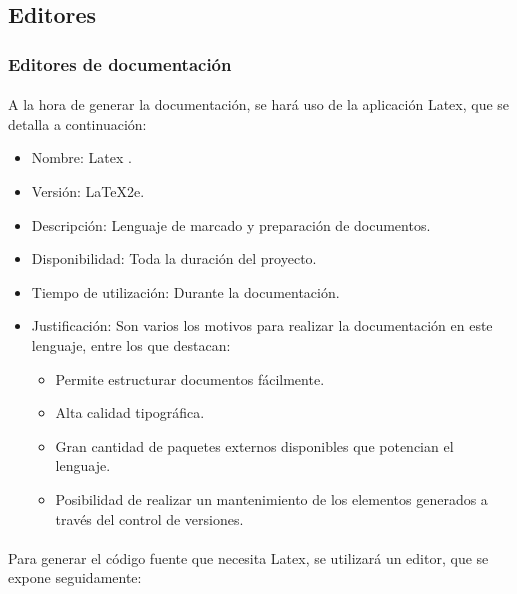    \subsection{Editores}

      \subsubsection{Editores de documentación}

      \paragraph{}A la hora de generar la documentación, se hará uso de la
      aplicación Latex, que se detalla a continuación:

      \begin{itemize}
         \item Nombre: Latex \cite{latex}.
         \item Versión: LaTeX2e.
         \item Descripción: Lenguaje de marcado y preparación de documentos.
         \item Disponibilidad: Toda la duración del proyecto.
         \item Tiempo de utilización: Durante la documentación.
         \item Justificación: Son varios los motivos para realizar la
         documentación en este lenguaje, entre los que destacan:
            \begin{itemize}
               \item Permite estructurar documentos fácilmente.
               \item Alta calidad tipográfica.
               \item Gran cantidad de paquetes externos disponibles que
               potencian el lenguaje.
               \item Posibilidad de realizar un mantenimiento de los elementos
               generados a través del control de versiones.
            \end{itemize}
      \end{itemize}

      \paragraph{}Para generar el código fuente que necesita Latex, se utilizará
      un editor, que se expone seguidamente:

